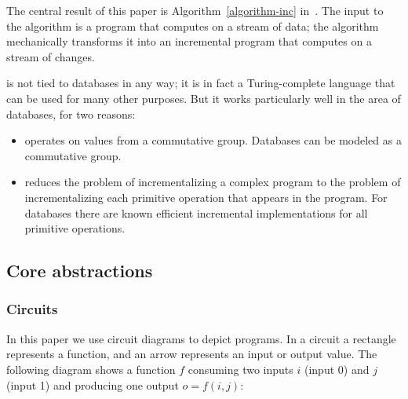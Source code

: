 The central result of this paper is Algorithm~\ref{algorithm-inc}
in~.  The input to the algorithm is a \dbsp
program that computes on a stream of data; the algorithm mechanically
transforms it into an incremental \dbsp program that computes on a
stream of changes.

\dbsp is not tied to databases in any way; it is in fact a
Turing-complete language that can be used for many other purposes.
But it works particularly well in the area of databases, for two
reasons:

\begin{itemize}[nosep, leftmargin=0pt, itemindent=0.5cm]
  \item \dbsp operates on values from a commutative group.  Databases
    can be modeled as a commutative group.
  \item \dbsp reduces the problem of incrementalizing a complex
    program to the problem of incrementalizing each primitive
    operation that appears in the program.  For databases there are
    known efficient incremental implementations for all primitive
    operations.
\end{itemize}

\subsection{Core abstractions}

\subsubsection{Circuits}

In this paper we use circuit diagrams to depict programs.  In a
circuit a rectangle represents a function, and an arrow represents an
input or output value.  The following diagram shows a function $f$
consuming two inputs $i$ (input 0) and $j$ (input 1) and producing one
output $o = f(i, j)$:
%
\begin{center}
\end{center}

